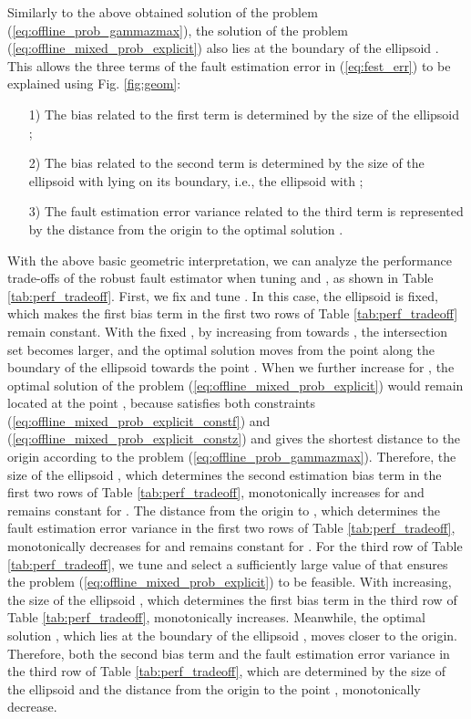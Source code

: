 \documentclass[twocolumn]{autart}
\begin{document}
Similarly to the above obtained solution  of the problem (\ref{eq:offline_prob_gammazmax}), the solution  of the problem (\ref{eq:offline_mixed_prob_explicit}) also lies at the boundary of the ellipsoid . This allows the three terms of the fault estimation error in (\ref{eq:fest_err}) to be explained using Fig. \ref{fig:geom}:
\begin{enumerate}
  \item[1)] The bias related to the first term  is determined by the size of the ellipsoid ;
  \item[2)] The bias related to the second term  is determined by the size of the ellipsoid  with  lying on its boundary, i.e., the ellipsoid  with ;
  \item[3)] The fault estimation error variance related to the third term   is represented by the distance from the origin to the optimal solution .
\end{enumerate}



With the above basic geometric interpretation, we can analyze the performance trade-offs of the robust fault estimator  when tuning  and , as shown in Table \ref{tab:perf_tradeoff}.
First, we fix  and tune . In this case, the ellipsoid  is fixed, which makes the first bias term in the first two rows of Table \ref{tab:perf_tradeoff} remain constant.
With the fixed , by increasing  from  towards , the intersection set  becomes larger, and the optimal solution  moves from the point  along the boundary of the ellipsoid  towards the point .
When we further increase  for , the optimal solution  of the problem (\ref{eq:offline_mixed_prob_explicit}) would remain located at the point , because  satisfies both constraints (\ref{eq:offline_mixed_prob_explicit_constf}) and
(\ref{eq:offline_mixed_prob_explicit_constz}) and gives the shortest distance to the origin according to the problem (\ref{eq:offline_prob_gammazmax}).
Therefore, the size of the ellipsoid , which determines the second estimation bias term in the first two rows of Table \ref{tab:perf_tradeoff}, monotonically increases for
 and remains constant for
. The distance from the origin to , which determines the fault estimation error variance in the first two rows of Table \ref{tab:perf_tradeoff}, monotonically decreases for
 and remains constant for . For the third row of Table \ref{tab:perf_tradeoff}, we tune  and select a sufficiently large value of  that ensures the problem (\ref{eq:offline_mixed_prob_explicit}) to be feasible. With  increasing, the size of the ellipsoid , which determines the first bias term in the third row of Table \ref{tab:perf_tradeoff}, monotonically increases. Meanwhile, the optimal solution
, which lies at the boundary of the ellipsoid , moves closer to the origin. Therefore, both the second bias term and the fault estimation error variance in the third row of Table \ref{tab:perf_tradeoff}, which are determined by the size of the ellipsoid  and the distance from the origin to the point , monotonically decrease.
\end{document}

